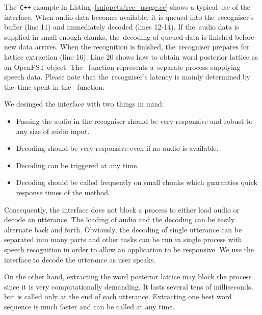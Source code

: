 The~\verb!C++! example in Listing~\ref{snippets/rec_usage.cc} shows a typical use of the~ interface.
When audio data becomes available, it is queued into the~recogniser's buffer (line 11) and immediately decoded (lines 12-14).
If the~audio data is supplied in small enough chunks, the~decoding of queued data is finished before new data arrives.
When the recognition is finished, the~recogniser prepares for lattice extraction (line 16).
Line 20 shows how to obtain word posterior lattice as an OpenFST object.
The~ function represents a~separate process supplying speech data.
Please note that the~recogniser's latency is mainly determined by the~time spent in the~ function.


We desinged the interface with two things in mind:
\begin{itemize}
    \item Passing the audio in the recogniser should be very responsive and robust to any size of audio input.
    \item Decoding should be very responsive even if no audio is available.
    \item Decoding can be triggered at any time.
    \item Decoding should be called frequently on small chunks which guaranties quick response times of the  method.
\end{itemize}

Consequently, the interface does not block a process to either load audio or decode an utterance.
The loading of audio and the decoding can be easily alternate back and forth.
Obviously, the decoding of single utterance can be separated into many parts and other tasks can be run in single process with speech recognition in order to allow an application to be responsive.
We use the interface to decode the utterance as user speaks.

On the other hand, extracting the word posterior lattice may block the process since it is very computationally demanding.
It lasts several tens of milliseconds, but is called only at the end of each utterance.
Extracting one best word sequence is much faster and can be called at any time.

